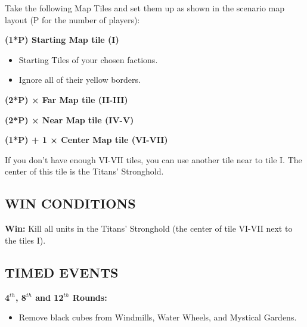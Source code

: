\begin{multicols*}{2}
Take the following Map Tiles and set them up as shown in the scenario map layout (P for the number of players):

\textbf{(1*P) Starting Map tile (I)}
\begin{itemize}
    \item Starting Tiles of your chosen factions.
    \item Ignore all of their yellow borders.
\end{itemize}

\textbf{(2*P) × Far Map tile (II-III)}

\textbf{(2*P) × Near Map tile (IV-V)}

\textbf{(1*P) + 1 × Center Map tile (VI-VII)}

If you don't have enough VI-VII tiles, you can use another tile near to tile I.
The center of this tile is the Titans' Stronghold.

\subsection*{\MakeUppercase{Win Conditions}}

\textbf{Win:} Kill all units in the Titans' Stronghold (the center of tile VI-VII next to the tiles I).

\subsection*{\MakeUppercase{Timed Events}}

\textbf{4$^{th}$, 8$^{th}$ and 12$^{th}$ Rounds:}
\begin{itemize}
    \item Remove black cubes from Windmills, Water Wheels, and Mystical Gardens.
\end{itemize}

\end{multicols*}

\newpage

